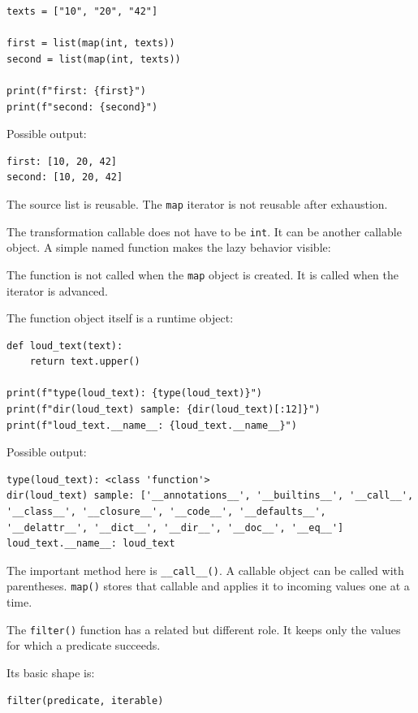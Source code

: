 \begin{verbatim}
texts = ["10", "20", "42"]

first = list(map(int, texts))
second = list(map(int, texts))

print(f"first: {first}")
print(f"second: {second}")
\end{verbatim}

Possible output:

\begin{verbatim}
first: [10, 20, 42]
second: [10, 20, 42]
\end{verbatim}

The source list is reusable. The \texttt{map} iterator is not reusable after exhaustion.

The transformation callable does not have to be \texttt{int}. It can be another callable object. A simple named function makes the lazy behavior visible:



The function is not called when the \texttt{map} object is created. It is called when the iterator is advanced.

The function object itself is a runtime object:

\begin{verbatim}
def loud_text(text):
    return text.upper()

print(f"type(loud_text): {type(loud_text)}")
print(f"dir(loud_text) sample: {dir(loud_text)[:12]}")
print(f"loud_text.__name__: {loud_text.__name__}")
\end{verbatim}

Possible output:

\begin{verbatim}
type(loud_text): <class 'function'>
dir(loud_text) sample: ['__annotations__', '__builtins__', '__call__',
'__class__', '__closure__', '__code__', '__defaults__',
'__delattr__', '__dict__', '__dir__', '__doc__', '__eq__']
loud_text.__name__: loud_text
\end{verbatim}

The important method here is \texttt{\_\_call\_\_()}. A callable object can be called with parentheses. \texttt{map()} stores that callable and applies it to incoming values one at a time.

The \texttt{filter()} function has a related but different role. It keeps only the values for which a predicate succeeds.

Its basic shape is:

\begin{verbatim}
filter(predicate, iterable)
\end{verbatim}

